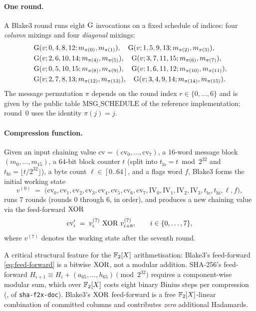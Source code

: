 \paragraph{One round.}
A Blake3 round runs eight $\operatorname{G}$ invocations on a fixed schedule of
indices: four \emph{column} mixings and four \emph{diagonal} mixings:
\begin{align*}
&\operatorname{G}(v;0,4, 8,12; m_{\pi(0)}, m_{\pi(1)}), \quad
 \operatorname{G}(v;1,5, 9,13; m_{\pi(2)}, m_{\pi(3)}), \\
&\operatorname{G}(v;2,6,10,14; m_{\pi(4)}, m_{\pi(5)}), \quad
 \operatorname{G}(v;3,7,11,15; m_{\pi(6)}, m_{\pi(7)}), \\
&\operatorname{G}(v;0,5,10,15; m_{\pi(8)}, m_{\pi(9)}), \quad
 \operatorname{G}(v;1,6,11,12; m_{\pi(10)}, m_{\pi(11)}), \\
&\operatorname{G}(v;2,7, 8,13; m_{\pi(12)}, m_{\pi(13)}), \quad
 \operatorname{G}(v;3,4, 9,14; m_{\pi(14)}, m_{\pi(15)}).
\end{align*}
The message permutation $\pi$ depends on the round index $r \in
\{0, \dots, 6\}$ and is given by the public table $\mathrm{MSG\_SCHEDULE}$
of the reference implementation; round~$0$ uses the identity
$\pi(j) = j$.

\paragraph{Compression function.}
Given an input chaining value $\mathrm{cv} = (\mathrm{cv}_0, \dots,
\mathrm{cv}_7)$, a $16$-word message block $(m_0, \dots, m_{15})$, a
$64$-bit block counter $t$ (split into $t_\mathrm{lo} = t \bmod
2^{32}$ and $t_\mathrm{hi} = \lfloor t / 2^{32} \rfloor$), a byte count
$\ell \in [0\mathbin{..}64]$, and a flags word $f$, Blake3 forms the
initial working state
\begin{equation}\label{eq:v-init}
v^{(0)} \;=\; \bigl(
   \mathrm{cv}_0, \mathrm{cv}_1, \mathrm{cv}_2, \mathrm{cv}_3,
   \mathrm{cv}_4, \mathrm{cv}_5, \mathrm{cv}_6, \mathrm{cv}_7,
   \mathrm{IV}_0, \mathrm{IV}_1, \mathrm{IV}_2, \mathrm{IV}_3,
   t_\mathrm{lo}, t_\mathrm{hi}, \ell, f
\bigr),
\end{equation}
runs $7$ rounds (rounds $0$ through $6$, in order), and produces a new
chaining value via the feed-forward $\operatorname{XOR}$
\begin{equation}\label{eq:feed-forward}
\mathrm{cv}'_i \;=\; v^{(7)}_i \,\operatorname{XOR}\, v^{(7)}_{i+8}, \qquad
i \in \{0, \dots, 7\},
\end{equation}
where $v^{(7)}$ denotes the working state after the seventh round.

\begin{remark}
\label{rem:feed-forward-xor}
A critical structural feature for the $\mathbb{F}_2[X]$ arithmetisation:
Blake3's feed-forward \eqref{eq:feed-forward} is a bitwise
$\operatorname{XOR}$, not a modular addition. SHA-256's feed-forward $H_{i+1}
\equiv H_i + (a_{65}, \dots, h_{65}) \pmod{2^{32}}$ requires a
component-wise modular sum, which over $\mathbb{F}_2[X]$ costs eight binary
Binius steps per compression (,  of
\texttt{sha-f2x-doc}). Blake3's $\operatorname{XOR}$ feed-forward is a free
$\mathbb{F}_2[X]$-linear combination of committed columns and contributes
\emph{zero} additional Hadamards.
\end{remark}

